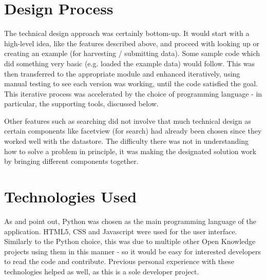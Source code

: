 \section{Design Process}
The technical design approach was certainly bottom-up. It would start with a high-level idea, like the features described above, and proceed with looking up or creating an example (for harvesting / submitting data). Some sample code which did something very basic (e.g. loaded the example data) would follow. This was then transferred to the appropriate module and enhanced iteratively, using manual testing to see each version was working, until the code satisfied the goal. This iterative process was accelerated by the choice of programming language - in particular, the supporting tools, discussed below.

Other features such as searching did not involve that much technical design as certain components like facetview (for search) had already been chosen since they worked well with the datastore. The difficulty there was not in understanding how to solve a problem in principle, it was making the designated solution work by bringing different components together.


\section{Technologies Used}
\label{devprocess-tech-used}


As  and  point out, Python was chosen as the main programming language of the application. HTML5, CSS and Javascript were used for the user interface. Similarly to the Python choice, this was due to multiple other Open Knowledge projects using them in this manner - so it would be easy for interested developers to read the code and contribute. Previous personal experience with these technologies helped as well, as this is a sole developer project.

